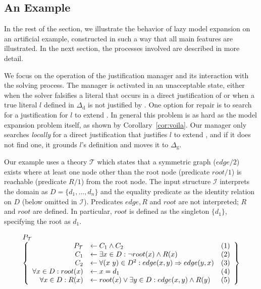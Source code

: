 \documentclass[11pt]{article}
\newcommand{\m}[1]{\ensuremath{#1}\xspace}
\newcommand{\limplies}{\m{\Rightarrow}}
\newcommand{\lrule}{\m{\leftarrow}}
\newcommand{\I}{\m{\mathcal{I}}}
\newcommand{\theory}{\m{\mathcal{T}}}
\newcommand{\D}{\m{\Delta}}
\newcommand{\typed}[2]{\m{#1\in #2:}}
\theoremstyle{plain}
\theoremstyle{definition}
\theoremstyle{example_basic}
\theoremstyle{example_contd}
\theoremstyle{plain}
\newcommand{\Dg}{\ensuremath{\D_\text{g}}\xspace}
\newcommand{\Dd}{\ensuremath{\D_\text{d}}\xspace}
\newcommand{\pt}{\ensuremath{P_\text{\theory}}\xspace}
\newcommand{\change}[1]{#1}
\begin{document}
\newcommand{\rt}{\ensuremath{root}}
\newcommand{\rtx}{\ensuremath{root}\xspace}

\subsection{An Example}\label{sec:lazyExample}

\change{In the rest of the section, we illustrate the behavior of lazy
  model expansion on an artificial example, constructed in such a way
  that all main features are illustrated. In the next section, the
  processes involved are described in more detail. }

\change{We focus on the operation of   the justification manager  and its interaction with the  solving process.  The  manager is activated in an unacceptable state, either when the solver falsifies a literal that occurs in a direct justification of \jgraph or when a true  literal $l$  defined in \Dd is not justified by \jgraph. One option for repair is to search for a justification for $l$ to extend \jgraph. In general this problem is as hard as the model expansion problem itself, as shown by Corollary~\ref{cor:voila}. Our manager only searches {\em locally} for a direct justification that justifies $l$ to extend \jgraph, and if it does not find one, it grounds $l$'s definition and moves it to \Dg.   }

Our example uses a theory \theory which states that a symmetric graph
($edge/2$) exists where at least one node other than the root node (predicate $\rtx/1$) 
is reachable (predicate $R/1$) from the root node. 
The input structure \I
interprets the domain  as $D = \{d_1,
\ldots, d_n\}$ \change{ and the equality predicate as the identity
  relation on $D$ (below omitted in \I)}. Predicates  $edge, R$ and \rtx are not interpreted; $R$ and $\rtx$ are defined.  In particular, \rtx is defined as the singleton $\{d_1\}$, specifying the root as $d_1$.

\[\begin{array}{l}
\pt \\
\left\{\begin{array}{rlr}
\pt &\lrule C_1 \land C_2 & (1) \\
C_1&\lrule \exists \typed{x}{D} \lnot \rt(x) \land R(x) & (2)\\
C_2&\lrule \forall \typed{(x~y)}{D^2} edge(x,y) \limplies edge(y,x) & (3) \\
\forall \typed{x}{D} \rt(x)&\lrule x=d_1 & (4) \\
\forall \typed{x}{D} R(x)&\lrule \rt(x) \lor \exists \typed{y}{D} edge(x,y)\land R(y) & (5)
\end{array}\right\}
\end{array}\]
\end{document}
